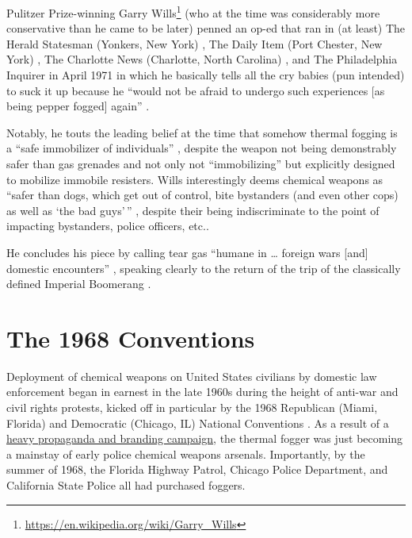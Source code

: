 \documentclass[
  11pt,
  titlepage]{krantz}
\renewcommand{\href}[2]{#2\footnote{\url{#1}}}
\begin{document}
Pulitzer Prize-winning \href{https://en.wikipedia.org/wiki/Garry_Wills}{Garry Wills} (who at the time was considerably more conservative than he came to be later) penned an op-ed that ran in (at least) The Herald Statesman (Yonkers, New York) \citep{Wills1971a}, The Daily Item (Port Chester, New York) \citep{Wills1971b}, The Charlotte News (Charlotte, North Carolina) \citep{Wills1971c}, and The Philadelphia Inquirer \citep{Wills1971d} in April 1971 in which he basically tells all the cry babies (pun intended) to suck it up because he ``would not be afraid to undergo such experiences {[}as being pepper fogged{]} again'' \citep{Wills1971a}.

Notably, he touts the leading belief at the time that somehow thermal fogging is a ``safe immobilizer of individuals'' \citep{Wills1971a}, despite the weapon not being demonstrably safer than gas grenades and not only not ``immobilizing'' but explicitly designed to mobilize immobile resisters.
Wills interestingly deems chemical weapons as ``safer than dogs, which get out of control, bite bystanders (and even other cops) as well as `the bad guys'\,'' \citep{Wills1971a}, despite their being indiscriminate to the point of impacting bystanders, police officers, etc..

He concludes his piece by calling tear gas ``humane in \ldots{} foreign wars {[}and{]} domestic encounters'' \citep{Wills1971a}, speaking clearly to the return of the trip of the classically defined Imperial Boomerang \citep{Cesaire1950, Arendt1951, Foucault1976}.

\hypertarget{The1968Conventions}{%
\chapter*{The 1968 Conventions}\label{The1968Conventions}}


Deployment of chemical weapons on United States civilians by domestic law enforcement began in earnest in the late 1960s during the height of anti-war and civil rights protests, kicked off in particular by the 1968 Republican (Miami, Florida) and Democratic (Chicago, IL) National Conventions \citep{McArdle2018, TaylorandMorris2018}.
As a result of a \protect\hyperlink{TheReturn}{heavy propaganda and branding campaign}, the thermal fogger was just becoming a mainstay of early police chemical weapons arsenals.
Importantly, by the summer of 1968, the Florida Highway Patrol, Chicago Police Department, and California State Police all had purchased foggers.
\end{document}
